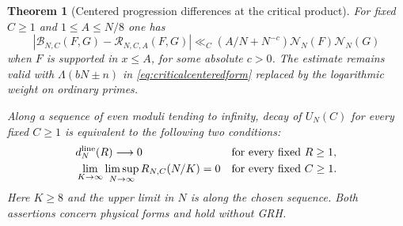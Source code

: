 \documentclass[11pt,a4paper]{article}
\numberwithin{equation}{section}
\newtheorem{theorem}{Theorem}[section]
\newcommand{\NN}{\mathcal N_N}
\begin{document}
\begin{theorem}[Centered progression differences at the critical product]
\label{thm:criticalcenteredrows}
For fixed $C\ge1$ and $1\le A\le N/8$ one has
\begin{equation}
 |\mathcal B_{N,C}(F,G)-\mathcal R_{N,C,A}(F,G)|
   \ll_C (A/N+N^{-c})\NN(F)\NN(G)
 \label{eq:criticalcenterederror}
\end{equation}
when $F$ is supported in $x\le A$, for some absolute $c>0$.
The estimate remains valid with $\Lambda(bN\pm n)$ in
\cref{eq:criticalcenteredform} replaced by the logarithmic
weight on ordinary primes.

Along a sequence of even moduli tending to infinity, decay
of $U_N(C)$ for every fixed $C\ge1$ is equivalent to the
following two conditions:
\begin{align}
 &d_N^{\mathrm{line}}(R)\longrightarrow0
            &&\text{for every fixed }R\ge1, \notag\\
 &\lim_{K\to\infty}\limsup_{N\to\infty} R_{N,C}(N/K)=0
            &&\text{for every fixed }C\ge1 .
 \label{eq:criticalcenteredcriterion}
\end{align}
Here $K\ge8$ and the upper limit in $N$ is along the chosen
sequence. Both assertions concern physical forms and hold
without GRH.
\end{theorem}
\end{document}
